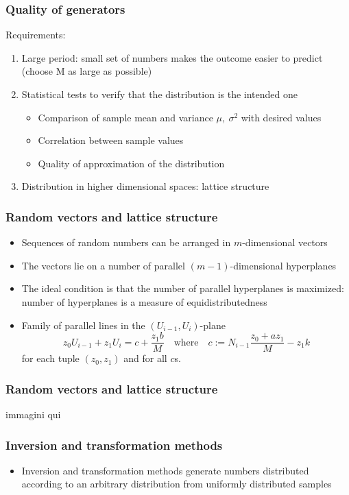 \documentclass[10pt, compress]{beamer}
\begin{document}
\begin{frame}[fragile]
  \frametitle{Quality of generators}
  Requirements:
  \begin{enumerate}
  	\item Large period: small set of numbers makes the outcome easier to predict (choose M as large as possible)
  	\item Statistical tests to verify that the distribution is the intended one
  	  \begin{itemize}
  	  	\item Comparison of sample mean and variance $\mu,\ \sigma^2$ with desired values
  	  	\item Correlation between sample values
  	  	\item Quality of approximation of the distribution
  	  \end{itemize}
     \item Distribution in higher dimensional spaces: lattice structure
  \end{enumerate}
\end{frame}

\begin{frame}[fragile]
  \frametitle{Random vectors and lattice structure}
  \begin{itemize}
  	\item Sequences of random numbers can be arranged in $m$-dimensional vectors
  	\item The vectors lie on a number of parallel $(m-1)$-dimensional hyperplanes
  	\item The ideal condition is that the number of parallel hyperplanes is maximized:
  	  number of hyperplanes is a measure of equidistributedness
  	\item Family of parallel lines in the $(U_{i-1},U_i)$-plane \[
  		z_0 U_{i-1} +z_1 U_i = c + \frac{z_1 b}{M} \quad \text{where} \quad c := N_{i-1}\frac{z_0 + az_1}{M} - z_1 k
  	  \] for each tuple $(z_0,z_1)$ and for all $c$s.
  \end{itemize}
\end{frame}

\begin{frame}[fragile]
  \frametitle{Random vectors and lattice structure}
  immagini qui
\end{frame}

\begin{frame}[fragile]
  \frametitle{Inversion and transformation methods}
  \begin{itemize}
  	\item Inversion and transformation methods generate numbers distributed according to
  	  an arbitrary distribution from uniformly distributed samples
  \end{itemize}
\end{frame}
\end{document}
